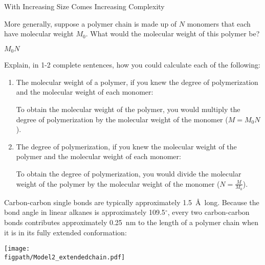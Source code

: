 \begin{activity}{With Increasing Size Comes Increasing Complexity}
\begin{ctqs}
	\question More generally, suppose a polymer chain is made up of $N$ monomers that each have molecular weight $M_0$.  What would the molecular weight of this polymer be?
	
		\begin{solution}[1in]
			$M_0 N$
		\end{solution}
	
	\question Explain, in 1-2 complete sentences, how you could calculate each of the following:
	
		\begin{enumerate}
			\item The molecular weight of a polymer, if you knew the degree of polymerization and the molecular weight of each monomer:
	
		\begin{solution}[1.75in]
			To obtain the molecular weight of the polymer, you would multiply the degree of polymerization by the molecular weight of the monomer ($M = M_0 N$).
		\end{solution}
			
			\item The degree of polymerization, if you knew the molecular weight of the polymer and the molecular weight of each monomer:
	
		\begin{solution}[1.75in]
			To obtain the degree of polymerization, you would divide the molecular weight of the polymer by the molecular weight of the monomer ($N = \frac{M}{M_0}$).
		\end{solution}
		
		\end{enumerate}
	
\end{ctqs}



\begin{model}
	
	Carbon-carbon single bonds are typically approximately 1.5~\AA\ long.  Because the bond angle in linear alkanes is approximately 109.5${}^\circ$, every two carbon-carbon bonds contributes approximately 0.25~nm to the length of a polymer chain when it is in its fully extended conformation:
	
	\vspace{6pt}
	\centerline{\texttt{[image: \\figpath/Model2\_extendedchain.pdf]}}
	\label{\labelbase:mdl:polyethylenesize}

\end{model}


\end{activity}
